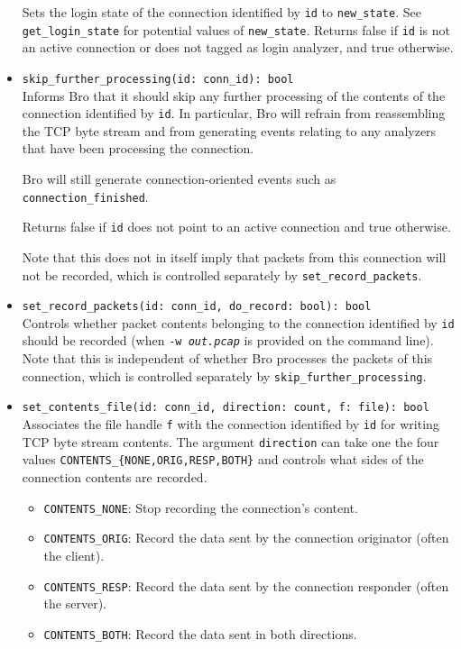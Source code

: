 \documentclass[10pt,landscape]{article}
\newcommand{\verbose}[1]{#1}
\newcommand{\verbose}[1]{}
\begin{document}
\begin{multicols*}{2}
\begin{itemize}
{    Sets the login state of the connection identified by \verb|id| to
    \verb|new_state|. See \verb|get_login_state| for potential values of
    \verb|new_state|. Returns false if \texttt{id} is not an active connection
    or does not tagged as login analyzer, and true otherwise.
}
  \item \verb|skip_further_processing(id: conn_id): bool|\\
    Informs Bro that it should skip any further processing of the contents of
    the connection identified by \verb|id|. In particular, Bro will refrain
    from reassembling the TCP byte stream and from generating events relating
    to any analyzers that have been processing the connection.
\verbose{
    Bro will still generate connection-oriented events such as
    \verb|connection_finished|.
}
    Returns false if \verb|id| does not point to an active connection and
    true otherwise.
\verbose{
    Note that this does not in itself imply that packets from
    this connection will not be recorded, which is controlled separately by
    \verb|set_record_packets|.
}
  \item \verb|set_record_packets(id: conn_id, do_record: bool): bool|\\
    Controls whether packet contents belonging to the connection identified by
    \verb|id| should be recorded (when \texttt{-w \textit{out.pcap}} is
    provided on the command line).
    Note that this is independent of whether Bro processes the packets of this
    connection, which is controlled separately by
    \verb|skip_further_processing|.
  \item \verb|set_contents_file(id: conn_id, direction: count, f: file): bool|\\
    Associates the file handle \verb|f| with the connection identified by
    \verb|id| for writing TCP byte stream contents. The argument
    \verb|direction| can take one the four values
    \verb|CONTENTS_{NONE,ORIG,RESP,BOTH}| and controls what sides of the
    connection contents are recorded.
\verbose{
    \begin{itemize}
      \item \verb|CONTENTS_NONE|: Stop recording the connection's content.
      \item \verb|CONTENTS_ORIG|: Record the data sent by the connection
        originator (often the client).
      \item \verb|CONTENTS_RESP|: Record the data sent by the connection
        responder (often the server).
      \item \verb|CONTENTS_BOTH|: Record the data sent in both directions.

\end{itemize}}
\end{itemize}
\end{multicols*}
\end{document}
